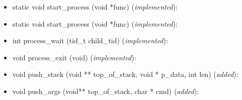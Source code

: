 \documentclass[11pt]{scrartcl}
\begin{document}
\begin{itemize}
	\item static void start\_process (void *func) (\textit{implemented}):\newline
	\item static void start\_process (void *func) (\textit{implemented}):\newline
	\item int process\_wait (tid\_t child\_tid) (\textit{implemented}):\newline
	\item void process\_exit (void) (\textit{implemented}):\newline
	\item void push\_stack (void ** top\_of\_stack, void * p\_data, int len) (\textit{added}):\newline
	\item void	push\_args (void** top\_of\_stack, char * cmd) (\textit{added}):\newline
	
\end{itemize}
\end{document}
